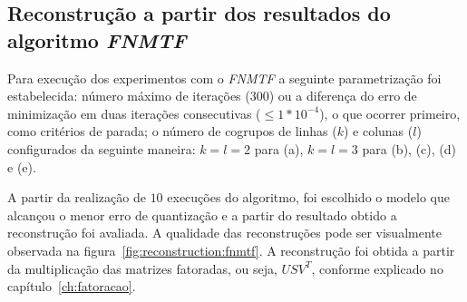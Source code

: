 \documentclass[
    12pt,                %
    oneside,            %
    a4paper,            %
    english,            %
    brazil                %
    ]{abntex2ppgsi}
\begin{document}
\begin{figure}[H]
\begin{subfigure}[b]{0.18\textwidth}
    \end{subfigure}
\label{fig:reconstruction-2:onmtf}
\end{figure}

\subsection{Reconstrução a partir dos resultados do algoritmo \textit{FNMTF}}
\label{subsec:results-reconstruction-fnmtf}

Para execução dos experimentos com o \textit{FNMTF} a seguinte parametrização foi estabelecida: número máximo de iterações ($300$) ou a diferença do erro de minimização em duas iterações consecutivas ($\leq 1 * 10^{-4}$), o que ocorrer primeiro, como critérios de parada; o número de cogrupos de linhas ($k$) e colunas ($l$) configurados da seguinte maneira: $k = l = 2$ para (a), $k = l = 3 $ para (b), (c), (d) e (e).

A partir da realização de $10$ execuções do algoritmo, foi escolhido o modelo que alcançou o menor erro de quantização e a partir do resultado obtido a reconstrução foi avaliada.
A qualidade das reconstruções pode ser visualmente observada na figura~\ref{fig:reconstruction:fnmtf}.
A reconstrução foi obtida a partir da multiplicação das matrizes fatoradas, ou seja, $USV^T$, conforme explicado no capítulo~\ref{ch:fatoracao}.
\end{document}
